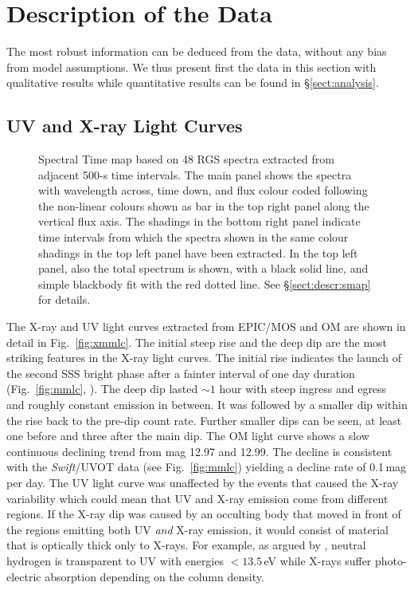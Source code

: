 \documentclass{aa}
\newcommand{\swift}{{\it Swift}}
\begin{document}
\section{Description of the Data}
\label{sect:descr}

The most robust information can be deduced from the data, without any
bias from model assumptions. We thus present first the data in this
section with qualitative results while quantitative results can be found
in \S\ref{sect:analysis}.

\subsection{UV and X-ray Light Curves}
\label{sect:descr:lc}

\begin{figure*}[!ht]
        \caption{\label{fig:smap}Spectral Time map based on 48 RGS spectra
extracted from adjacent 500-s time intervals. The main panel shows the
spectra with wavelength across, time down, and flux colour coded following
the non-linear colours shown as bar in the top right panel along the vertical
flux axis. The shadings in the bottom right panel indicate time intervals
from which the spectra shown in the same colour shadings in the top left
panel have been extracted. In the top left panel, also the total spectrum
is shown, with a black solid line, and simple blackbody fit with the red
dotted line. See \S\ref{sect:descr:smap} for details.}
\end{figure*}

The X-ray and UV light curves extracted from EPIC/MOS and OM are shown
in detail in Fig.~\ref{fig:xmmlc}. The initial steep rise and the deep dip
are the most striking features in the X-ray light curves. The initial rise
indicates the launch of the second SSS bright phase after a fainter interval
of one day duration (Fig.~\ref{fig:mmlc}, \citealt{singh20}).
The deep dip lasted
$\sim 1$ hour with steep ingress and egress and roughly constant emission in
between. It was followed by a smaller dip within the rise back to the pre-dip
count rate. Further smaller dips can be seen, at least one before and three
after the main dip. The OM light curve shows a slow continuous declining trend from
mag 12.97 and 12.99. The decline is consistent with the \swift/UVOT data
(see Fig.~\ref{fig:mmlc}) yielding a decline rate of 0.1\,mag per day. The UV
light curve was unaffected by the events that caused the X-ray variability
which could mean that UV and X-ray emission come from different regions. If
the X-ray dip was caused by an occulting body that moved in front of the
regions emitting both UV {\em and} X-ray emission, it would consist of material
that is optically thick only to X-rays. For example, as argued by
\cite{nessusco}, neutral hydrogen is transparent to UV with energies
$<13.5$\,eV while X-rays suffer photo-electric absorption depending on
the column density.\\
\end{document}
